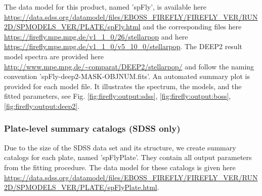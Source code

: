 \documentclass[onecolumn]{aa}
\begin{document}
The data model for this product, named 'spFly', is available here \url{https://data.sdss.org/datamodel/files/EBOSS_FIREFLY/FIREFLY_VER/RUN2D/SPMODELS_VER/PLATE/spFly.html} and the corresponding files here \url{https://firefly.mpe.mpg.de/v1_1_0/26/stellarpop} and here \url{https://firefly.mpe.mpg.de/v1_1_0/v5_10_0/stellarpop}. 
The DEEP2 result model spectra are provided here \url{http://www.mpe.mpg.de/~comparat/DEEP2/stellarpop/} and follow the naming convention 'spFly-deep2-MASK-OBJNUM.fits'. 
An automated summary plot is provided for each model file. 
It illustrates the spectrum, the models, and the fitted parameters, see Fig. \ref{fig:firefly:output:sdss}, \ref{fig:firefly:output:boss}, \ref{fig:firefly:output:deep2}. 

\subsubsection{Plate-level summary catalogs (SDSS only)}
Due to the size of the SDSS data set and its structure, we create summary catalogs for each plate, named 'spFlyPlate'.
They contain all output parameters from the fitting procedure. 
The data model for these catalogs is given here 
\url{https://data.sdss.org/datamodel/files/EBOSS_FIREFLY/FIREFLY_VER/RUN2D/SPMODELS_VER/PLATE/spFlyPlate.html}. %

\end{document}
